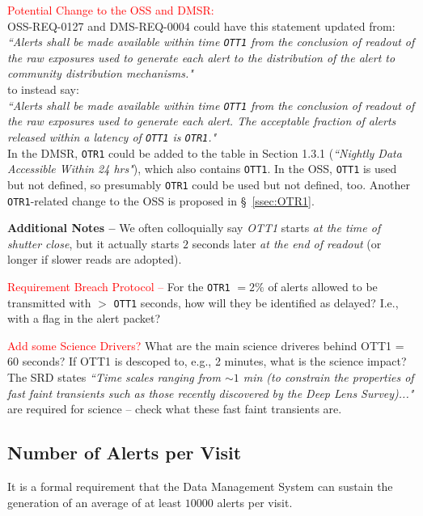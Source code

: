 \documentclass[DM,authoryear,toc]{lsstdoc}
\begin{document}
\textcolor{red}{Potential Change to the OSS and DMSR:} \\
OSS-REQ-0127  and DMS-REQ-0004  could have this statement updated from: \\
{\it ``Alerts shall be made available within time {\tt OTT1} from the conclusion of readout of the raw exposures used to generate each alert to the distribution of the alert to community distribution mechanisms."} \\
to instead say: \\
{\it ``Alerts shall be made available within time {\tt OTT1} from the conclusion of readout of the raw exposures used to generate each alert. The acceptable fraction of alerts released within a latency of {\tt OTT1} is {\tt OTR1}."}\\
In the DMSR, {\tt OTR1} could be added to the table in Section 1.3.1 ({\it ``Nightly Data Accessible Within 24 hrs"}), which also contains {\tt OTT1}. In the OSS, {\tt OTT1} is used but not defined, so presumably {\tt OTR1} could be used but not defined, too. Another {\tt OTR1}-related change to the OSS is proposed in \S~\ref{ssec:OTR1}.

{\bf Additional Notes --} We often colloquially say {\it OTT1} starts {\it at the time of shutter close}, but it actually starts $2$ seconds later {\it at the end of readout} (or longer if slower reads are adopted).

\textcolor{red}{Requirement Breach Protocol --} For the {\tt OTR1} $=2\%$ of alerts allowed to be transmitted with $>$ {\tt OTT1} seconds, how will they be identified as delayed? I.e., with a flag in the alert packet?

\textcolor{red}{Add some Science Drivers?} What are the main science driveres behind OTT1 = 60 seconds? If OTT1 is descoped to, e.g., 2 minutes, what is the science impact? The SRD states {\it ``Time scales ranging from $\sim1$ min (to constrain the properties of fast faint transients such as those recently discovered by the Deep Lens Survey)..."} are required for science -- check what these fast faint transients are.


\subsection{Number of Alerts per Visit}\label{ssec:transN}

It is a formal requirement that the Data Management System can sustain the generation of an average of at least $10000$ alerts per visit. 
\end{document}

